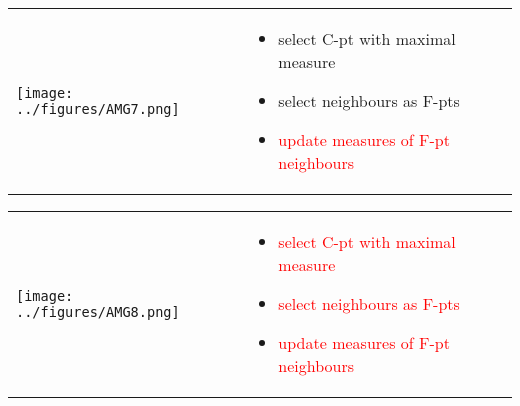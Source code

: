 \documentclass{beamer}
\newcommand{\re}[1]{{\textcolor{red}       {#1}}}
\begin{document}
\begin{frame}


\begin{tabular}{ p{} p{}}

\hspace{5mm} \texttt{[image: ../figures/AMG7.png]} &

\vspace{-1.75in}

\begin{itemize}
  \item select C-pt with maximal measure
  \item select neighbours as F-pts
  \item \re{update measures of F-pt neighbours}

\end{itemize}

\end{tabular}

\end{frame}




\begin{frame}



\begin{tabular}{ p{} p{}}

\hspace{5mm} \texttt{[image: ../figures/AMG8.png]} &

\vspace{-1.75in}

\begin{itemize}
  \item \re{select C-pt with maximal measure}
  \item \re{select neighbours as F-pts}
  \item \re{update measures of F-pt neighbours}

\end{itemize}

\end{tabular}


\end{frame}
\end{document}
